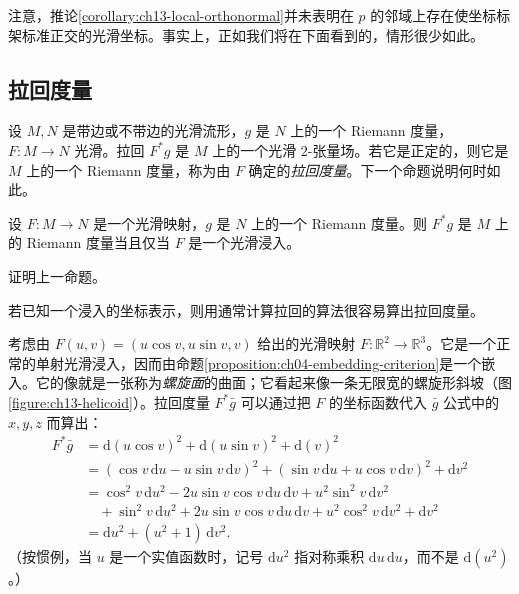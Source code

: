 \documentclass[../../main.tex]{subfiles}
\begin{document}
注意，推论\ref{corollary:ch13-local-orthonormal}并未表明在 $p$ 的邻域上存在使坐标标架标准正交的光滑坐标。事实上，正如我们将在下面看到的，情形很少如此。

\subsection{拉回度量}

设 $M,N$ 是带边或不带边的光滑流形，$g$ 是 $N$ 上的一个 Riemann 度量，$F:M\to N$ 光滑。拉回 $F^*g$ 是 $M$ 上的一个光滑 $2$-张量场。若它是正定的，则它是 $M$ 上的一个 Riemann 度量，称为由 $F$ 确定的\emph{拉回度量}。下一个命题说明何时如此。

\begin{proposition}[拉回度量判别法]\label{proposition:ch13-pullback-criterion}
设 $F:M\to N$ 是一个光滑映射，$g$ 是 $N$ 上的一个 Riemann 度量。则 $F^*g$ 是 $M$ 上的 Riemann 度量当且仅当 $F$ 是一个光滑浸入。
\end{proposition}

\begin{exercise}\label{exercise:ch13-10}
证明上一命题。
\end{exercise}

若已知一个浸入的坐标表示，则用通常计算拉回的算法很容易算出拉回度量。

\begin{example}\label{example:ch13-helicoid}
考虑由 $F(u,v)=(u\cos v,u\sin v,v)$ 给出的光滑映射 $F:\mathbb{R}^2\to\mathbb{R}^3$。它是一个正常的单射光滑浸入，因而由命题\ref{proposition:ch04-embedding-criterion}是一个嵌入。它的像就是一张称为\emph{螺旋面}的曲面；它看起来像一条无限宽的螺旋形斜坡（图\ref{figure:ch13-helicoid}）。拉回度量 $F^*\bar g$ 可以通过把 $F$ 的坐标函数代入 $\bar g$ 公式中的 $x,y,z$ 而算出：
\begin{align*}
F^*\bar g&=\mathrm{d}(u\cos v)^2+\mathrm{d}(u\sin v)^2+\mathrm{d}(v)^2\\
&=(\cos v\,\mathrm{d}u-u\sin v\,\mathrm{d}v)^2+(\sin v\,\mathrm{d}u+u\cos v\,\mathrm{d}v)^2+\mathrm{d}v^2\\
&=\cos^2 v\,\mathrm{d}u^2-2u\sin v\cos v\,\mathrm{d}u\,\mathrm{d}v+u^2\sin^2 v\,\mathrm{d}v^2\\
&\quad+\sin^2 v\,\mathrm{d}u^2+2u\sin v\cos v\,\mathrm{d}u\,\mathrm{d}v+u^2\cos^2 v\,\mathrm{d}v^2+\mathrm{d}v^2\\
&=\mathrm{d}u^2+(u^2+1)\,\mathrm{d}v^2.
\end{align*}
（按惯例，当 $u$ 是一个实值函数时，记号 $\mathrm{d}u^2$ 指对称乘积 $\mathrm{d}u\,\mathrm{d}u$，而不是 $\mathrm{d}(u^2)$。）
\end{example}
\end{document}
